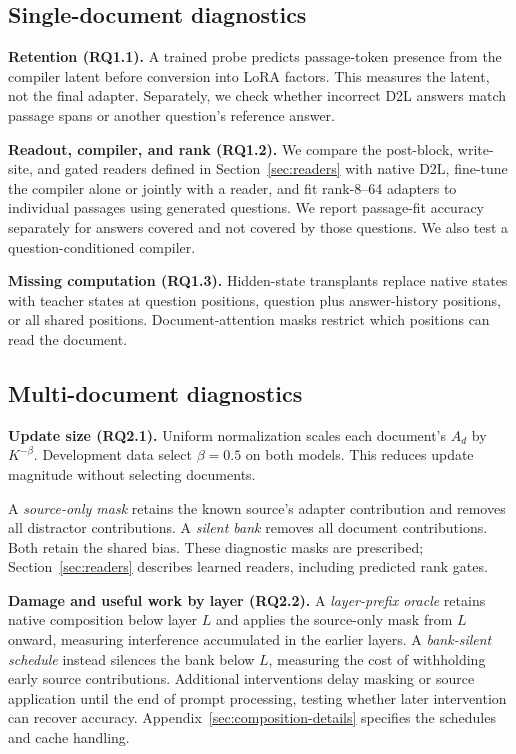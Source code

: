\subsection{Single-document diagnostics}
\label{sec:diagnostics}

\textbf{Retention (RQ1.1).} A trained probe predicts passage-token presence
from the compiler latent before conversion into LoRA factors. This measures
the latent, not the final adapter. Separately, we check whether incorrect D2L
answers match passage spans or another question's reference answer.

\textbf{Readout, compiler, and rank (RQ1.2).} We compare the post-block,
write-site, and gated readers defined in Section~\ref{sec:readers} with native D2L, fine-tune the compiler alone or
jointly with a reader, and fit rank-8--64 adapters to individual passages using
generated questions. We report passage-fit accuracy separately for answers
covered and not covered by those questions. We also test a question-conditioned compiler.

\textbf{Missing computation (RQ1.3).} Hidden-state transplants replace native
states with teacher states at question positions, question plus answer-history
positions, or all shared positions. Document-attention masks restrict which
positions can read the document.

\subsection{Multi-document diagnostics}
\label{sec:composition-diagnostics}

\textbf{Update size (RQ2.1).} Uniform normalization scales each document's
$A_d$ by $K^{-\beta}$. Development data select $\beta=0.5$ on both models.
This reduces update magnitude without selecting documents.

A \emph{source-only mask} retains the known source's adapter contribution and
removes all distractor contributions. A \emph{silent bank} removes all document
contributions. Both retain the shared bias. These diagnostic masks are prescribed;
Section~\ref{sec:readers} describes learned readers, including predicted rank gates.

\textbf{Damage and useful work by layer (RQ2.2).} A \emph{layer-prefix oracle}
retains native composition below layer $L$ and applies the source-only mask
from $L$ onward, measuring interference accumulated in the earlier layers.
A \emph{bank-silent schedule} instead silences the bank below $L$, measuring
the cost of withholding early source contributions. Additional interventions
delay masking or source application until the end of prompt processing,
testing whether later intervention can recover accuracy.
Appendix~\ref{sec:composition-details} specifies the schedules and cache handling.


